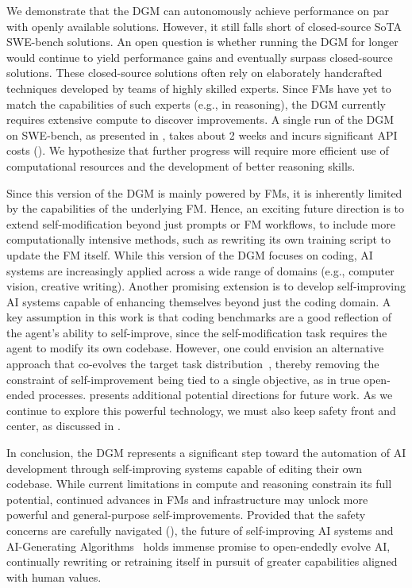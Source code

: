 \documentclass{article} %
\begin{document}
We demonstrate that the DGM can autonomously achieve performance on par with openly available solutions. However, it still falls short of closed-source SoTA SWE-bench solutions. An open question is whether running the DGM for longer would continue to yield performance gains and eventually surpass closed-source solutions. These closed-source solutions often rely on elaborately handcrafted techniques developed by teams of highly skilled experts. Since FMs have yet to match the capabilities of such experts (e.g., in reasoning), the DGM currently requires extensive compute to discover improvements. A single run of the DGM on SWE-bench, as presented in , takes about 2 weeks and incurs significant API costs (). We hypothesize that further progress will require more efficient use of computational resources and the development of better reasoning skills.

Since this version of the DGM is mainly powered by FMs, it is inherently limited by the capabilities of the underlying FM. Hence, an exciting future direction is to extend self-modification beyond just prompts or FM workflows, to include more computationally intensive methods, such as rewriting its own training script to update the FM itself. While this version of the DGM focuses on coding, AI systems are increasingly applied across a wide range of domains (e.g., computer vision, creative writing). Another promising extension is to develop self-improving AI systems capable of enhancing themselves beyond just the coding domain. A key assumption in this work is that coding benchmarks are a good reflection of the agent's ability to self-improve, since the self-modification task requires the agent to modify its own codebase. However, one could envision an alternative approach that co-evolves the target task distribution~\citep{faldor2025omni, wang2023robogen}, thereby removing the constraint of self-improvement being tied to a single objective, as in true open-ended processes.  presents additional potential directions for future work. As we continue to explore this powerful technology, we must also keep safety front and center, as discussed in .

In conclusion, the DGM represents a significant step toward the automation of AI development through self-improving systems capable of editing their own codebase. While current limitations in compute and reasoning constrain its full potential, continued advances in FMs and infrastructure may unlock more powerful and general-purpose self-improvements. Provided that the safety concerns are carefully navigated (), the future of self-improving AI systems and AI-Generating Algorithms~\citep{clune2019ai} holds immense promise to open-endedly evolve AI, continually rewriting or retraining itself in pursuit of greater capabilities aligned with human values.
\end{document}
